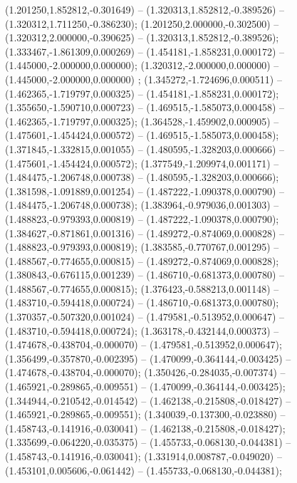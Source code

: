  (1.201250,1.852812,-0.301649) -- (1.320313,1.852812,-0.389526) -- (1.320312,1.711250,-0.386230);
 (1.201250,2.000000,-0.302500) -- (1.320312,2.000000,-0.390625) -- (1.320313,1.852812,-0.389526);
 (1.333467,-1.861309,0.000269) -- (1.454181,-1.858231,0.000172) -- (1.445000,-2.000000,0.000000);
 (1.320312,-2.000000,0.000000) -- (1.445000,-2.000000,0.000000) ;
 (1.345272,-1.724696,0.000511) -- (1.462365,-1.719797,0.000325) -- (1.454181,-1.858231,0.000172);
 (1.355650,-1.590710,0.000723) -- (1.469515,-1.585073,0.000458) -- (1.462365,-1.719797,0.000325);
 (1.364528,-1.459902,0.000905) -- (1.475601,-1.454424,0.000572) -- (1.469515,-1.585073,0.000458);
 (1.371845,-1.332815,0.001055) -- (1.480595,-1.328203,0.000666) -- (1.475601,-1.454424,0.000572);
 (1.377549,-1.209974,0.001171) -- (1.484475,-1.206748,0.000738) -- (1.480595,-1.328203,0.000666);
 (1.381598,-1.091889,0.001254) -- (1.487222,-1.090378,0.000790) -- (1.484475,-1.206748,0.000738);
 (1.383964,-0.979036,0.001303) -- (1.488823,-0.979393,0.000819) -- (1.487222,-1.090378,0.000790);
 (1.384627,-0.871861,0.001316) -- (1.489272,-0.874069,0.000828) -- (1.488823,-0.979393,0.000819);
 (1.383585,-0.770767,0.001295) -- (1.488567,-0.774655,0.000815) -- (1.489272,-0.874069,0.000828);
 (1.380843,-0.676115,0.001239) -- (1.486710,-0.681373,0.000780) -- (1.488567,-0.774655,0.000815);
 (1.376423,-0.588213,0.001148) -- (1.483710,-0.594418,0.000724) -- (1.486710,-0.681373,0.000780);
 (1.370357,-0.507320,0.001024) -- (1.479581,-0.513952,0.000647) -- (1.483710,-0.594418,0.000724);
 (1.363178,-0.432144,0.000373) -- (1.474678,-0.438704,-0.000070) -- (1.479581,-0.513952,0.000647);
 (1.356499,-0.357870,-0.002395) -- (1.470099,-0.364144,-0.003425) -- (1.474678,-0.438704,-0.000070);
 (1.350426,-0.284035,-0.007374) -- (1.465921,-0.289865,-0.009551) -- (1.470099,-0.364144,-0.003425);
 (1.344944,-0.210542,-0.014542) -- (1.462138,-0.215808,-0.018427) -- (1.465921,-0.289865,-0.009551);
 (1.340039,-0.137300,-0.023880) -- (1.458743,-0.141916,-0.030041) -- (1.462138,-0.215808,-0.018427);
 (1.335699,-0.064220,-0.035375) -- (1.455733,-0.068130,-0.044381) -- (1.458743,-0.141916,-0.030041);
 (1.331914,0.008787,-0.049020) -- (1.453101,0.005606,-0.061442) -- (1.455733,-0.068130,-0.044381);
